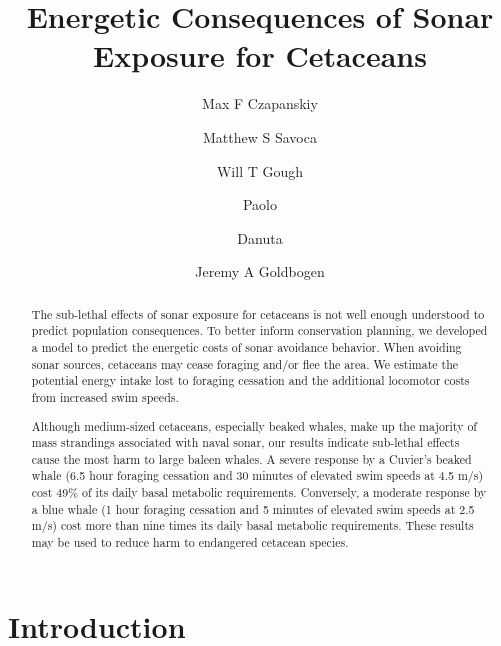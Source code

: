 \documentclass[]{elsarticle} %
\begin{document}
\begin{frontmatter}

  \title{Energetic Consequences of Sonar Exposure for Cetaceans}
    \author[1]{Max F Czapanskiy}
    \author[1]{Matthew S Savoca}
  
  
    \author[1]{Will T Gough}
  
  
    \author[1]{Paolo}
  
  
    \author[1]{Danuta}
  
  
    \author[1]{Jeremy A Goldbogen}
  
  
      \address[1]{Department of Biology, Hopkins Marine Station, Stanford University, 120
Ocean View Boulevard, Pacific Grove, CA 93950, USA}
  
  \begin{abstract}
  The sub-lethal effects of sonar exposure for cetaceans is not well
  enough understood to predict population consequences. To better inform
  conservation planning, we developed a model to predict the energetic
  costs of sonar avoidance behavior. When avoiding sonar sources,
  cetaceans may cease foraging and/or flee the area. We estimate the
  potential energy intake lost to foraging cessation and the additional
  locomotor costs from increased swim speeds.
  
  Although medium-sized cetaceans, especially beaked whales, make up the
  majority of mass strandings associated with naval sonar, our results
  indicate sub-lethal effects cause the most harm to large baleen whales.
  A severe response by a Cuvier's beaked whale (6.5 hour foraging
  cessation and 30 minutes of elevated swim speeds at 4.5 m/s) cost 49\%
  of its daily basal metabolic requirements. Conversely, a moderate
  response by a blue whale (1 hour foraging cessation and 5 minutes of
  elevated swim speeds at 2.5 m/s) cost more than nine times its daily
  basal metabolic requirements. These results may be used to reduce harm
  to endangered cetacean species.
  \end{abstract}
  
 \end{frontmatter}

\doublespacing
\linenumbers

\section{Introduction}\label{introduction}
\end{document}
